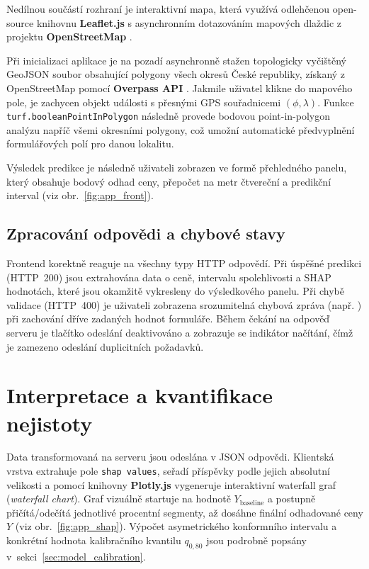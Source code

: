 Nedílnou součástí rozhraní je interaktivní mapa, která využívá odlehčenou open-source knihovnu \textbf{Leaflet.js} \cite{LeafletJS} s asynchronním dotazováním mapových dlaždic z projektu \textbf{OpenStreetMap} \cite{OpenStreetMap}.

Při inicializaci aplikace je na pozadí asynchronně stažen topologicky vyčištěný GeoJSON soubor obsahující polygony všech okresů České republiky, získaný z OpenStreetMap pomocí \textbf{Overpass API} \cite{OverpassTurbo}. Jakmile uživatel klikne do mapového pole, je zachycen objekt události s přesnými GPS souřadnicemi $(\phi, \lambda)$. Funkce \texttt{turf.booleanPointInPolygon} \cite{TurfJS} následně provede bodovou point-in-polygon analýzu napříč všemi okresními polygony, což umožní automatické předvyplnění formulářových polí pro danou lokalitu.

Výsledek predikce je následně uživateli zobrazen ve formě přehledného panelu, který obsahuje bodový odhad ceny, přepočet na metr čtvereční a predikční interval (viz obr.~\ref{fig:app_front}).

\subsection*{Zpracování odpovědi a chybové stavy}
Frontend korektně reaguje na všechny typy HTTP odpovědí. Při úspěšné predikci (HTTP~200) jsou extrahována data o ceně, intervalu spolehlivosti a SHAP hodnotách, které jsou okamžitě vykresleny do výsledkového panelu. Při chybě validace (HTTP~400) je uživateli zobrazena srozumitelná chybová zpráva (např. ) při zachování dříve zadaných hodnot formuláře. Během čekání na odpověď serveru je tlačítko odeslání deaktivováno a zobrazuje se indikátor načítání, čímž je zamezeno odeslání duplicitních požadavků.

\section{Interpretace a kvantifikace nejistoty}
\label{sec:interpretace_nejistota}
Data transformovaná na serveru jsou odeslána v JSON odpovědi. Klientská vrstva extrahuje pole \texttt{shap values}, seřadí příspěvky podle jejich absolutní velikosti a pomocí knihovny \textbf{Plotly.js} vygeneruje interaktivní waterfall graf (\textit{waterfall chart}). Graf vizuálně startuje na hodnotě $Y_{\text{baseline}}$ a postupně přičítá/odečítá jednotlivé procentní segmenty, až dosáhne finální odhadované ceny $Y$ (viz obr.~\ref{fig:app_shap}). Výpočet asymetrického konformního intervalu a konkrétní hodnota kalibračního kvantilu $q_{0{,}80}$ jsou podrobně popsány v~sekci~\ref{sec:model_calibration}.

